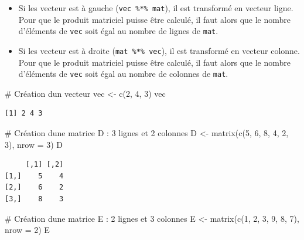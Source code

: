 \documentclass[
  french,
  a4paper,
  DIV=11,
  numbers=noendperiod,
  oneside]{scrreprt}
\newenvironment{Shaded}{}{}
\newcommand{\AttributeTok}[1]{\textcolor[rgb]{0.84,0.23,0.29}{#1}}
\newcommand{\CommentTok}[1]{\textcolor[rgb]{0.42,0.45,0.49}{#1}}
\newcommand{\DecValTok}[1]{\textcolor[rgb]{0.00,0.36,0.77}{#1}}
\newcommand{\FunctionTok}[1]{\textcolor[rgb]{0.44,0.26,0.76}{#1}}
\newcommand{\NormalTok}[1]{\textcolor[rgb]{0.14,0.16,0.18}{#1}}
\newcommand{\OtherTok}[1]{\textcolor[rgb]{0.44,0.26,0.76}{#1}}
\providecommand{\tightlist}{%
  \setlength{\itemsep}{0pt}\setlength{\parskip}{0pt}}
\begin{document}
\begin{tcolorbox}
\begin{itemize}
\tightlist
\item
  Si les vecteur est à gauche (\texttt{vec\ \%*\%\ mat}), il est
  transformé en vecteur ligne. Pour que le produit matriciel puisse être
  calculé, il faut alors que le nombre d'éléments de \texttt{vec} soit
  égal au nombre de lignes de \texttt{mat}.
\item
  Si les vecteur est à droite (\texttt{mat\ \%*\%\ vec}), il est
  transformé en vecteur colonne. Pour que le produit matriciel puisse
  être calculé, il faut alors que le nombre d'éléments de \texttt{vec}
  soit égal au nombre de colonnes de \texttt{mat}.
\end{itemize}

\begin{Shaded}
\begin{Highlighting}[]
\CommentTok{\# Création d\textquotesingle{}un vecteur}
\NormalTok{vec }\OtherTok{\textless{}{-}} \FunctionTok{c}\NormalTok{(}\DecValTok{2}\NormalTok{, }\DecValTok{4}\NormalTok{, }\DecValTok{3}\NormalTok{)}
\NormalTok{vec}
\end{Highlighting}
\end{Shaded}

\begin{verbatim}
[1] 2 4 3
\end{verbatim}

\begin{Shaded}
\begin{Highlighting}[]
\CommentTok{\# Création d\textquotesingle{}une matrice D : 3 lignes et 2 colonnes}
\NormalTok{D }\OtherTok{\textless{}{-}} \FunctionTok{matrix}\NormalTok{(}\FunctionTok{c}\NormalTok{(}\DecValTok{5}\NormalTok{, }\DecValTok{6}\NormalTok{, }\DecValTok{8}\NormalTok{, }\DecValTok{4}\NormalTok{, }\DecValTok{2}\NormalTok{, }\DecValTok{3}\NormalTok{), }\AttributeTok{nrow =} \DecValTok{3}\NormalTok{)}
\NormalTok{D}
\end{Highlighting}
\end{Shaded}

\begin{verbatim}
     [,1] [,2]
[1,]    5    4
[2,]    6    2
[3,]    8    3
\end{verbatim}

\begin{Shaded}
\begin{Highlighting}[]
\CommentTok{\# Création d\textquotesingle{}une matrice E : 2 lignes et 3 colonnes}
\NormalTok{E }\OtherTok{\textless{}{-}} \FunctionTok{matrix}\NormalTok{(}\FunctionTok{c}\NormalTok{(}\DecValTok{1}\NormalTok{, }\DecValTok{2}\NormalTok{, }\DecValTok{3}\NormalTok{, }\DecValTok{9}\NormalTok{, }\DecValTok{8}\NormalTok{, }\DecValTok{7}\NormalTok{), }\AttributeTok{nrow =} \DecValTok{2}\NormalTok{)}
\NormalTok{E}
\end{Highlighting}
\end{Shaded}


\end{tcolorbox}
\end{document}
